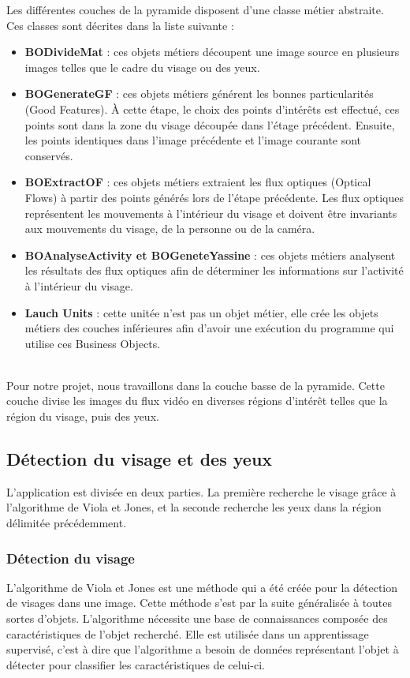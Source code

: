 Les différentes couches de la pyramide disposent d'une classe métier abstraite. Ces classes 
sont décrites dans la liste suivante :\\

\begin{itemize}
 \item \textbf{BODivideMat} : ces objets métiers découpent une image source en plusieurs images telles que 
 le cadre du visage ou des yeux.
 \item \textbf{BOGenerateGF} : ces objets métiers générent les bonnes particularités (Good Features). 
 À cette étape, le choix des points d'intérêts est effectué, ces points sont dans la zone du visage 
 découpée dans l'étage précédent. Ensuite, les points identiques dans l'image précédente et l'image 
 courante sont conservés.
 \item \textbf{BOExtractOF} : ces objets métiers extraient les flux optiques (Optical Flows) à partir 
 des points générés lors de l'étape précédente. Les flux optiques représentent les mouvements à l'intérieur 
 du visage et doivent être invariants aux mouvements du visage, de la personne ou de la caméra.
 \item \textbf{BOAnalyseActivity et BOGeneteYassine} : ces objets métiers analysent les résultats 
 des flux optiques afin de déterminer les informations sur l'activité à l'intérieur du visage.
 \item \textbf{Lauch Units} : cette unitée n'est pas un objet métier, elle crée les objets métiers des 
 couches inférieures afin d'avoir une exécution du programme qui utilise ces Business Objects.
\end{itemize}
\ \\

Pour notre projet, nous travaillons dans la couche basse de la pyramide. Cette couche divise
les images du flux vidéo en diverses régions d'intérêt telles que la région du visage, puis 
des yeux.

\subsection{Détection du visage et des yeux}

L'application est divisée en deux parties. La première recherche le visage grâce à
l'algorithme de Viola et Jones, et la seconde recherche les yeux dans la région délimitée
précédemment.\\

\subsubsection{Détection du visage}
L'algorithme de Viola et Jones\cite{Viola04robustreal-time} est une méthode qui a été créée pour la détection de visages dans une 
image. Cette méthode s'est par la suite généralisée à toutes sortes d'objets. L'algorithme nécessite une 
base de connaissances composée des caractéristiques de l'objet recherché. Elle est utilisée dans un 
apprentissage supervisé, c'est à dire que l'algorithme a besoin de données représentant
l'objet à détecter pour classifier les caractéristiques de celui-ci.\\

